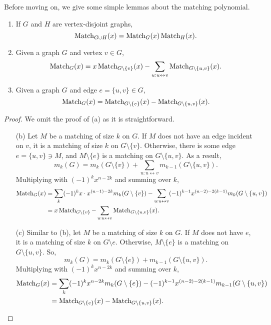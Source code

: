 	Before moving on, we give some simple lemmas about the matching polynomial.
	\begin{flem}
		\label{lem: matching polynomial basic results}
		\phantom{pain}
		\begin{enumerate}[label=(\alph*)]
			\item If $G$ and $H$ are vertex-disjoint graphs,
			\[ \operatorname{Match}_{G \cup H}(x) = \operatorname{Match}_G(x) \operatorname{Match}_H(x). \]
			\item Given a graph $G$ and vertex $v \in G$,
			\[ \operatorname{Match}_G(x) = x \operatorname{Match}_{G \setminus \{v\}}(x) - \sum_{u : u \leftrightarrow v} \operatorname{Match}_{G \setminus \{u,v\}} (x). \]
			\item Given a graph $G$ and edge $e = \{u,v\} \in G$,
			\[ \operatorname{Match}_G(x) = \operatorname{Match}_{G\setminus\{e\}}(x) - \operatorname{Match}_{G\setminus\{u,v\}}(x). \]
		\end{enumerate}
	\end{flem}
	\begin{proof}
		We omit the proof of (a) as it is straightforward.
		\begin{itemize}
			\item[(b)] Let $M$ be a matching of size $k$ on $G$. If $M$ does not have an edge incident on $v$, it is a matching of size $k$ on $G \setminus \{v\}$. Otherwise, there is some edge $e = \{u,v\} \ni M$, and $M \setminus \{e\}$ is a matching on $G \setminus \{u,v\}$. As a result,
			\[ m_k(G) = m_k(G\setminus \{v\}) + \sum_{u : u \leftrightarrow v} m_{k-1}(G\setminus\{u,v\}). \]
			Multiplying with $(-1)^k x^{n-2k}$ and summing over $k$,
			\begin{align*}
				\operatorname{Match}_G(x) &= \sum_k (-1)^k x \cdot x^{(n-1)-2k} m_k(G \setminus \{v\}) - \sum_{u : u \leftrightarrow v} (-1)^{k-1} x^{(n-2)-2(k-1)} m_k(G \setminus \{u,v\}) \\
					&= x\operatorname{Match}_{G\setminus\{v\}} - \sum_{u : u \leftrightarrow v} \operatorname{Match}_{G \setminus \{u,v\}} (x).
			\end{align*}
			\item[(c)] Similar to (b), let $M$ be a matching of size $k$ on $G$. If $M$ does not have $e$, it is a matching of size $k$ on $G \setminus e$. Otherwise, $M \setminus \{e\}$ is a matching on $G \setminus \{u,v\}$. So,
			\[ m_k(G) = m_k(G \setminus \{e\}) + m_{k-1}(G \setminus \{u,v\}). \]
			Multiplying with $(-1)^k x^{n-2k}$ and summing over $k$,
			\begin{align*}
				\operatorname{Match}_G(x) &= \sum_k (-1)^k x^{n-2k} m_k(G\setminus\{e\}) - (-1)^{k-1} x^{(n-2)-2(k-1)} m_{k-1}(G\setminus\{u,v\}) \\
					&= \operatorname{Match}_{G\setminus\{e\}}(x) - \operatorname{Match}_{G\setminus\{u,v\}}(x). \qedhere
			\end{align*}
		\end{itemize}
	\end{proof}


